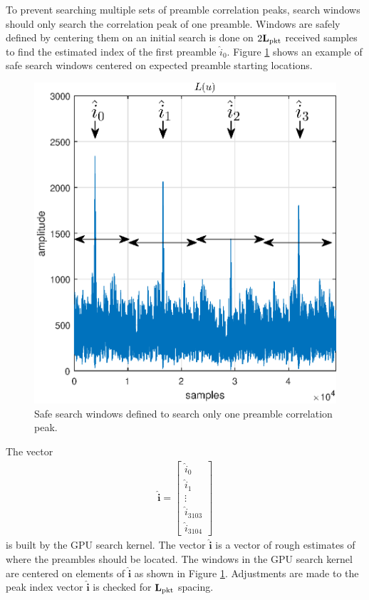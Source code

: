 To prevent searching multiple sets of preamble correlation peaks, search windows should only search the correlation peak of one preamble.
Windows are safely defined by centering them on an initial search is done on $2\mathbf{L}_\text{pkt}$ received samples to find the estimated index of the first preamble $\hat{i}_0$.
Figure \ref{fig:L_windows} shows an example of safe search windows centered on expected preamble starting locations.
\begin{figure}
	\centering\includegraphics[width=5in]{figures/gpu/L_windows.eps}
	\caption{Safe search windows defined to search only one preamble correlation peak.}
	\label{fig:L_windows}
\end{figure}
The vector
\begin{align}
\hat{\mathbf{i}}
=     
\begin{bmatrix}
\hat{i}_0 	\\
\hat{i}_1	\\
\vdots		\\
\hat{i}_{3103}	\\
\hat{i}_{3104}  		
\end{bmatrix}
\label{eq:preamble_det_i_hat}
\end{align}
is built by the GPU search kernel.
The vector $\hat{\mathbf{i}}$ is a vector of rough estimates of where the preambles should be located.
The windows in the GPU search kernel are centered on elements of $\hat{\mathbf{i}}$ as shown in Figure \ref{fig:L_windows}.
Adjustments are made to the peak index vector $\hat{\mathbf{i}}$ is checked for $\mathbf{L}_\text{pkt}$ spacing.

